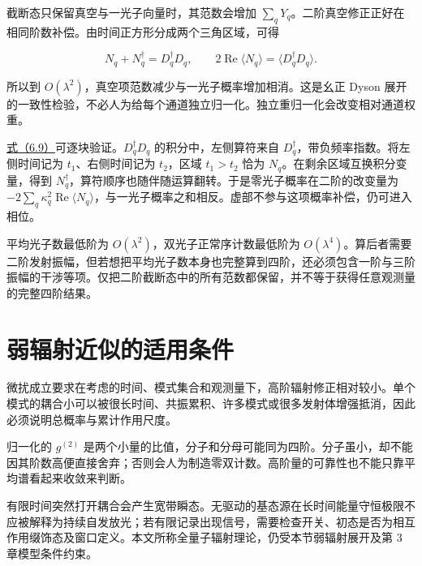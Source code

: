 \documentclass[UTF8,a4paper,zihao=-4,openany,fontset=fandol]{ctexbook}
\begin{document}
截断态只保留真空与一光子向量时，其范数会增加 $\sum_qY_q$。二阶真空修正正好在相同阶数补偿。由时间正方形分成两个三角区域，可得



\begin{equation*}
N_q+N_q^\dagger=D_q^\dagger D_q,
\qquad
2\operatorname{Re}\langle N_q\rangle=\langle D_q^\dagger D_q\rangle.
\tag{6.9}\label{eq:6.9}
\end{equation*}


所以到 $O(\lambda^2)$，真空项范数减少与一光子概率增加相消。这是幺正 Dyson 展开的一致性检验，不必人为给每个通道独立归一化。独立重归一化会改变相对通道权重。



\hyperref[eq:6.9]{式（6.9）}可逐块验证。$D_q^\dagger D_q$ 的积分中，左侧算符来自 $D_q^\dagger$，带负频率指数。将左侧时间记为 $t_1$、右侧时间记为 $t_2$，区域 $t_1>t_2$ 恰为 $N_q$。在剩余区域互换积分变量，得到 $N_q^\dagger$，算符顺序也随伴随运算翻转。于是零光子概率在二阶的改变量为 $-2\sum_q\kappa_q^2\operatorname{Re}\langle N_q\rangle$，与一光子概率之和相反。虚部不参与这项概率补偿，仍可进入相位。



平均光子数最低阶为 $O(\lambda^2)$，双光子正常序计数最低阶为 $O(\lambda^4)$。算后者需要二阶发射振幅，但若想把平均光子数本身也完整算到四阶，还必须包含一阶与三阶振幅的干涉等项。仅把二阶截断态中的所有范数都保留，并不等于获得任意观测量的完整四阶结果。



\section{弱辐射近似的适用条件}\label{sec:06:10}


微扰成立要求在考虑的时间、模式集合和观测量下，高阶辐射修正相对较小。单个模式的耦合小可以被很长时间、共振累积、许多模式或很多发射体增强抵消，因此必须说明总概率与累计作用尺度。



归一化的 $g^{(2)}$ 是两个小量的比值，分子和分母可能同为四阶。分子虽小，却不能因其阶数高便直接舍弃；否则会人为制造零双计数。高阶量的可靠性也不能只靠平均谱看起来收敛来判断。



有限时间突然打开耦合会产生宽带瞬态。无驱动的基态源在长时间能量守恒极限不应被解释为持续自发放光；若有限记录出现信号，需要检查开关、初态是否为相互作用缀饰态及窗口定义。本文所称全量子辐射理论，仍受本节弱辐射展开及第 3 章模型条件约束。
\end{document}
